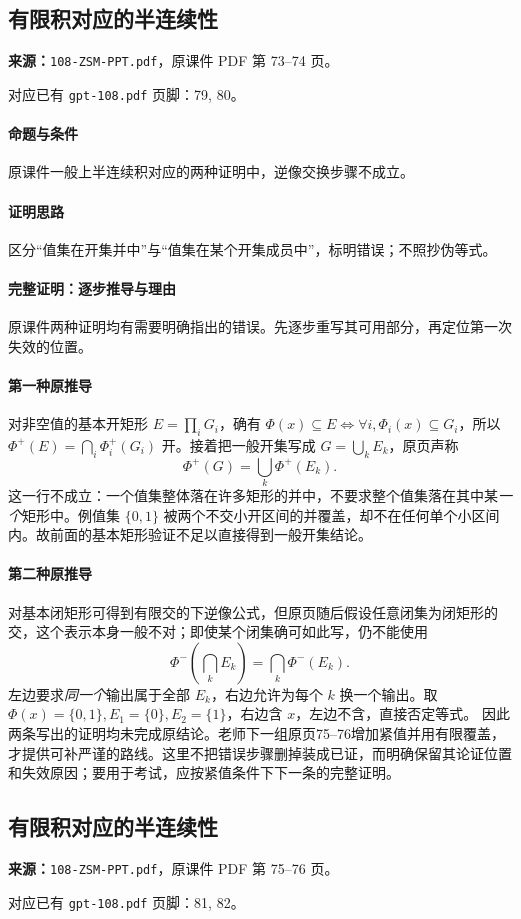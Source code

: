 \clearpage\subsection{有限积对应的半连续性}
\textbf{来源：}\texttt{108-ZSM-PPT.pdf}，原课件 PDF 第 73--74 页。\par
对应已有 \texttt{gpt-108.pdf} 页脚：79, 80。\par
\paragraph{命题与条件}原课件一般上半连续积对应的两种证明中，逆像交换步骤不成立。
\paragraph{证明思路}区分“值集在开集并中”与“值集在某个开集成员中”，标明错误；不照抄伪等式。
\paragraph{完整证明：逐步推导与理由}

原课件两种证明均有需要明确指出的错误。先逐步重写其可用部分，再定位第一次失效的位置。
\paragraph{第一种原推导}对非空值的基本开矩形 $E=\prod_iG_i$，确有 $\Phi(x)\subseteq E\iff\forall i,\Phi_i(x)\subseteq G_i$，所以 $\Phi^+(E)=\bigcap_i\Phi_i^+(G_i)$ 开。接着把一般开集写成 $G=\bigcup_kE_k$，原页声称
\[\Phi^+(G)=\bigcup_k\Phi^+(E_k).\]
这一行不成立：一个值集整体落在许多矩形的并中，不要求整个值集落在其中某\emph{一个}矩形中。例值集 $\{0,1\}$ 被两个不交小开区间的并覆盖，却不在任何单个小区间内。故前面的基本矩形验证不足以直接得到一般开集结论。
\paragraph{第二种原推导}对基本闭矩形可得到有限交的下逆像公式，但原页随后假设任意闭集为闭矩形的交，这个表示本身一般不对；即使某个闭集确可如此写，仍不能使用
\[\Phi^-(\bigcap_kE_k)=\bigcap_k\Phi^-(E_k).\]
左边要求\emph{同一个}输出属于全部 $E_k$，右边允许为每个 $k$ 换一个输出。取 $\Phi(x)=\{0,1\},E_1=\{0\},E_2=\{1\}$，右边含 $x$，左边不含，直接否定等式。
因此两条写出的证明均未完成原结论。老师下一组原页75--76增加紧值并用有限覆盖，才提供可补严谨的路线。这里不把错误步骤删掉装成已证，而明确保留其论证位置和失效原因；要用于考试，应按紧值条件下下一条的完整证明。

\clearpage\subsection{有限积对应的半连续性}
\textbf{来源：}\texttt{108-ZSM-PPT.pdf}，原课件 PDF 第 75--76 页。\par
对应已有 \texttt{gpt-108.pdf} 页脚：81, 82。\par
